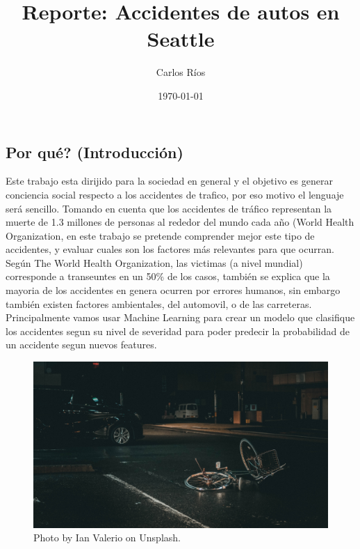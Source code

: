 \documentclass[12pt]{article}
\begin{document}
\title{Reporte: Accidentes de autos en Seattle}

\author{Carlos Ríos} 
\date{\small{\today}}

\maketitle


\section*{}
\subsection*{Por qué? (Introducción)}
Este trabajo esta dirijido para la sociedad en general y el objetivo es generar conciencia social respecto a los accidentes de trafico, por eso motivo el lenguaje será sencillo. Tomando en cuenta que los accidentes de tráfico representan la muerte de 1.3 millones de personas al rededor del mundo cada año (World Health Organization, en este trabajo se pretende comprender mejor este tipo de accidentes, y evaluar cuales son los factores más relevantes para que ocurran. Según The World Health Organization, las victimas (a nivel mundial) corresponde a transeuntes en un 50\% de los casos, también se explica que la mayoria de los accidentes en genera ocurren por errores humanos, sin embargo también existen factores ambientales, del automovil, o de las carreteras. Principalmente vamos usar Machine Learning para crear un modelo que clasifique los accidentes segun su nivel de severidad para poder predecir la probabilidad de un accidente segun nuevos features. \

\begin{figure}[htbp]
  \centering
    \includegraphics[width=1\textwidth]{../images/ian-valerio-9UxW_MqBGe4-unsplash.jpg}
  \caption{Photo by Ian Valerio on Unsplash.}
  \label{fig:intro}
\end{figure}
\end{document}
